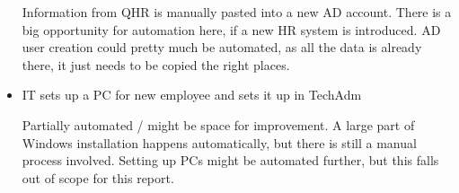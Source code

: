 \begin{itemize}
		Information from QHR is manually pasted into a new AD account. There is a big opportunity for automation here, if a new HR system is introduced. AD user creation could pretty much be automated, as all the data is already there, it just needs to be copied the right places.
	
	\item{IT sets up a PC for new employee and sets it up in TechAdm}
	
		Partially automated / might be space for improvement. A large part of Windows installation happens automatically, but there is still a manual process involved.
		Setting up PCs might be automated further, but this falls out of scope for this report.
	
\end{itemize}